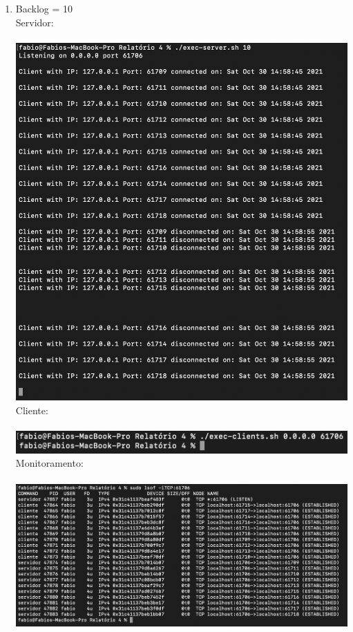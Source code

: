 \documentclass[12pt,a4paper]{report}
\begin{document}
\begin{enumerate}
\begin{enumerate}
        \item Backlog = 10\\
        Servidor:\\\\
        \includegraphics[width=1\textwidth]{images/servidor-backlog-10.png}
        Cliente:\\\\
        \includegraphics[width=1\textwidth]{images/cliente-backlog-10.png}
        Monitoramento:\\\\
        \includegraphics[width=1\textwidth]{images/lsof-backlog-10.png}
    \end{enumerate}
    

\end{enumerate}
\end{document}
